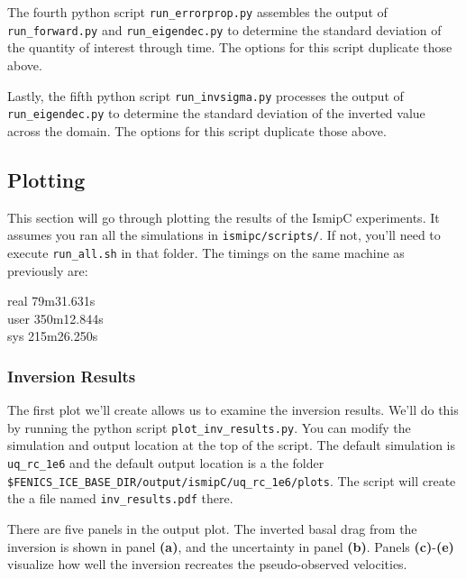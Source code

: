 \documentclass[11pt, reqno, nocenter]{article}
\begin{document}
The fourth python script {\tt run\_errorprop.py} assembles the output of {\tt run\_forward.py} and {\tt run\_eigendec.py} to determine the standard deviation of the quantity of interest through time. The options for this script duplicate those above.

Lastly, the fifth python script {\tt run\_invsigma.py} processes the output of {\tt run\_eigendec.py} to determine the standard deviation of the inverted value across the domain. The options for this script duplicate those above.

\subsection{Plotting}

This section will go through plotting the results of the IsmipC experiments. It assumes you ran all the simulations in {\tt ismipc/scripts/}. If not, you'll need to execute {\tt run\_all.sh} in that folder. The timings on the same machine as previously are:

real    \hspace{10mm}79m31.631s         \\                                                                                            
user   \hspace{8mm} 350m12.844s      \\                                                                                               
sys     \hspace{11mm}215m26.250s    \\

\subsubsection{Inversion Results}
The first plot we'll create allows us to examine the inversion results. We'll do this by running the python script {\tt plot\_inv\_results.py}. You can modify the simulation and output location at the top of the script. The default simulation is {\tt uq\_rc\_1e6} and the default output location is a the folder {\tt \$FENICS\_ICE\_BASE\_DIR/output/ismipC/uq\_rc\_1e6/plots}. The script will create the a file named {\tt inv\_results.pdf} there.


There are five panels in the output plot. The inverted basal drag from the inversion is shown in panel  \textbf{(a)}, and the uncertainty in panel  \textbf{(b)}. Panels  \textbf{(c)}-\textbf{(e)} visualize how well the inversion recreates the pseudo-observed velocities. 
\end{document}
